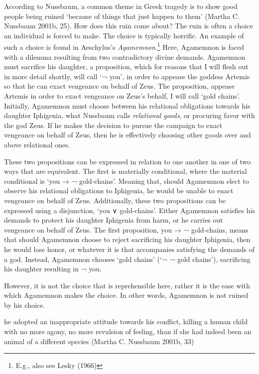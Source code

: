\documentclass[
  letterpaper,
  DIV=11,
  numbers=noendperiod]{scrartcl}
\theoremstyle{remark}
\begin{document}
According to Nussbaum, a common theme in Greek tragedy is to show good
people being ruined `because of things that just happen to them' (Martha
C. Nussbaum 2001b, 25). How does this ruin come about? The ruin is often
a choice an individual is forced to make. The choice is typically
horrific. An example of such a choice is found in Aeschylus's
\emph{Agamemnon}.\footnote{E.g., also see Lesky (1966)} Here, Agamemnon
is faced with a dilemma resulting from two contradictory divine demands.
Agamemnon must sacrifice his daughter, a proposition, which for reasons
that I will flesh out in more detail shortly, will call `¬ you', in
order to appease the goddess Artemis so that he can exact vengeance on
behalf of Zeus. The proposition, appease Artemis in order to exact
vengeance on Zeus's behalf, I will call `gold chains'. Initially,
Agamemnon must choose between his relational obligations towards his
daughter Iphigenia, what Nussbaum calls \emph{relational goods}, or
procuring favor with the god Zeus. If he makes the decision to pursue
the campaign to exact vengeance on behalf of Zeus, then he is
effectively choosing other goods over and above relational ones.

These two propositions can be expressed in relation to one another in
one of two ways that are equivalent. The first is materially
conditional, where the material conditional is `you → ¬ gold-chains'.
Meaning that, should Agamemnon elect to observe his relational
obligations to Iphigenia, he would be unable to enact vengeance on
behalf of Zeus. Additionally, these two propositions can be expressed
using a disjunction, `you ∨ gold-chains'. Either Agamemnon satisfies his
demands to protect his daughter Iphigenia from harm, or he carries out
vengeance on behalf of Zeus. The first proposition, you → ¬ gold-chains,
means that should Agamemnon choose to reject sacrificing his daughter
Iphigenia, then he would lose honor, or whatever it is that accompanies
satisfying the demands of a god. Instead, Agamemnon chooses `gold
chains' (`¬ ¬ gold chains'), sacrificing his daughter resulting in ¬
you.

However, it is not the choice that is reprehensible here, rather it is
the ease with which Agamemnon makes the choice. In other words,
Agamemnon is not ruined by his choice.

he adopted an inappropriate attitude towards his conflict, killing a
human child with no more agony, no more revulsion of feeling, than if
she had indeed been an animal of a different species (Martha C. Nussbaum
2001b, 33)
\end{document}
